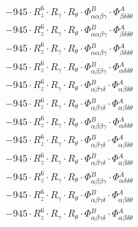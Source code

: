 \documentclass{article}
\begin{document}
\begin{subequations}
\begin{gather}
\begin{array}{c}
 \\[0.2em] 		 - 945 \cdot R_{z}^{6} \cdot R_{\gamma{}} \cdot R_{\theta{}} \cdot \Phi{}^{B}_{\alpha{}\alpha{}\beta{}\gamma{}} \cdot \Phi{}^{A}_{\beta{}\delta{}\delta{}\theta{}} 
 \\[0.2em] 		 - 945 \cdot R_{z}^{6} \cdot R_{\gamma{}} \cdot R_{\theta{}} \cdot \Phi{}^{B}_{\alpha{}\alpha{}\beta{}\gamma{}} \cdot \Phi{}^{A}_{\beta{}\delta{}\delta{}\theta{}} 
 \\[0.2em] 		 - 945 \cdot R_{z}^{6} \cdot R_{\gamma{}} \cdot R_{\theta{}} \cdot \Phi{}^{B}_{\alpha{}\alpha{}\beta{}\gamma{}} \cdot \Phi{}^{A}_{\beta{}\delta{}\delta{}\theta{}} 
 \\[0.2em] 		 - 945 \cdot R_{z}^{6} \cdot R_{\gamma{}} \cdot R_{\theta{}} \cdot \Phi{}^{B}_{\alpha{}\beta{}\beta{}\gamma{}} \cdot \Phi{}^{A}_{\alpha{}\delta{}\delta{}\theta{}} 
 \\[0.2em] 		 - 945 \cdot R_{z}^{6} \cdot R_{\gamma{}} \cdot R_{\theta{}} \cdot \Phi{}^{B}_{\alpha{}\beta{}\gamma{}\delta{}} \cdot \Phi{}^{A}_{\alpha{}\beta{}\delta{}\theta{}} 
 \\[0.2em] 		 - 945 \cdot R_{z}^{6} \cdot R_{\gamma{}} \cdot R_{\theta{}} \cdot \Phi{}^{B}_{\alpha{}\beta{}\gamma{}\delta{}} \cdot \Phi{}^{A}_{\alpha{}\beta{}\delta{}\theta{}} 
 \\[0.2em] 		 - 945 \cdot R_{z}^{6} \cdot R_{\gamma{}} \cdot R_{\theta{}} \cdot \Phi{}^{B}_{\alpha{}\beta{}\beta{}\gamma{}} \cdot \Phi{}^{A}_{\alpha{}\delta{}\delta{}\theta{}} 
 \\[0.2em] 		 - 945 \cdot R_{z}^{6} \cdot R_{\gamma{}} \cdot R_{\theta{}} \cdot \Phi{}^{B}_{\alpha{}\beta{}\gamma{}\delta{}} \cdot \Phi{}^{A}_{\alpha{}\beta{}\delta{}\theta{}} 
 \\[0.2em] 		 - 945 \cdot R_{z}^{6} \cdot R_{\gamma{}} \cdot R_{\theta{}} \cdot \Phi{}^{B}_{\alpha{}\beta{}\gamma{}\delta{}} \cdot \Phi{}^{A}_{\alpha{}\beta{}\delta{}\theta{}} 
 \\[0.2em] 		 - 945 \cdot R_{z}^{6} \cdot R_{\gamma{}} \cdot R_{\theta{}} \cdot \Phi{}^{B}_{\alpha{}\beta{}\beta{}\gamma{}} \cdot \Phi{}^{A}_{\alpha{}\delta{}\delta{}\theta{}} 
 \\[0.2em] 		 - 945 \cdot R_{z}^{6} \cdot R_{\gamma{}} \cdot R_{\theta{}} \cdot \Phi{}^{B}_{\alpha{}\beta{}\gamma{}\delta{}} \cdot \Phi{}^{A}_{\alpha{}\beta{}\delta{}\theta{}} 
 \\[0.2em] 		 - 945 \cdot R_{z}^{6} \cdot R_{\gamma{}} \cdot R_{\theta{}} \cdot \Phi{}^{B}_{\alpha{}\beta{}\gamma{}\delta{}} \cdot \Phi{}^{A}_{\alpha{}\beta{}\delta{}\theta{}} 

\end{array}
\end{gather}
\end{subequations}
\end{document}
